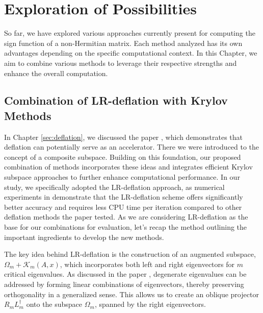 \chapter{Exploration of Possibilities}
\label{sec:expl_poss}

So far, we have explored various approaches currently present for computing the sign function of a non-Hermitian matrix. Each method analyzed has its own advantages depending on the specific computational context. In this Chapter, we aim to combine various methods to leverage their respective strengths and enhance the overall computation.

\section{Combination of LR-deflation with Krylov Methods}
\label{sec:comb_LR_def_kryl_method}

In Chapter \ref{sec:deflation}, we discussed the paper \cite{11}, which demonstrates that deflation can potentially serve as an accelerator. There we were introduced to the concept of a composite subspace. Building on this foundation, our proposed combination of methods incorporates these ideas and integrates efficient Krylov subspace approaches to further enhance computational performance. In our study, we specifically adopted the LR-deflation approach, as numerical experiments in \cite{11} demonstrate that the LR-deflation scheme offers significantly better accuracy and requires less CPU time per iteration compared to other deflation methods the paper tested. As we are considering LR-deflation as the base for our combinations for evaluation, let's recap the method outlining the important ingredients to develop the new methods.

The key idea behind LR-deflation is the construction of an augmented subspace, 
$\Omega_{m} + \mathcal{K}_{m}(A, x)$, which incorporates both left and right 
eigenvectors for $m$ critical eigenvalues. As discussed in the paper \cite{11}, 
degenerate eigenvalues can be addressed by forming linear combinations of 
eigenvectors, thereby preserving orthogonality in a generalized sense. This 
allows us to create an oblique projector $R_{m}L_{m}^{\dagger}$ onto the 
subspace $\Omega_{m}$, spanned by the right eigenvectors.

